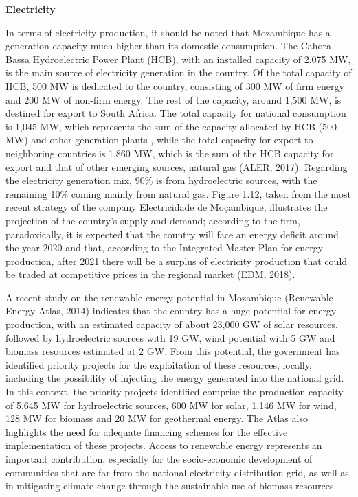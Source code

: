 \documentclass[
]{book}
\begin{document}
\textbf{Electricity}

In terms of electricity production, it should be noted that Mozambique has a generation capacity much higher than its domestic consumption. The Cahora Bassa Hydroelectric Power Plant (HCB), with an installed capacity of 2,075 MW, is the main source of electricity generation in the country. Of the total capacity of HCB, 500 MW is dedicated to the country, consisting of 300 MW of firm energy and 200 MW of non-firm energy. The rest of the capacity, around 1,500 MW, is destined for export to South Africa. The total capacity for national consumption is 1,045 MW, which represents the sum of the capacity allocated by HCB (500 MW) and other generation plants , while the total capacity for export to neighboring countries is 1,860 MW, which is the sum of the HCB capacity for export and that of other emerging sources, natural gas (ALER, 2017). Regarding the electricity generation mix, 90\% is from hydroelectric sources, with the remaining 10\% coming mainly from natural gas. Figure 1.12, taken from the most recent strategy of the company Electricidade de Moçambique, illustrates the projection of the country's supply and demand; according to the firm, paradoxically, it is expected that the country will face an energy deficit around the year 2020 and that, according to the Integrated Master Plan for energy production, after 2021 there will be a surplus of electricity production that could be traded at competitive prices in the regional market (EDM, 2018).

A recent study on the renewable energy potential in Mozambique (Renewable Energy Atlas, 2014) indicates that the country has a huge potential for energy production, with an estimated capacity of about 23,000 GW of solar resources, followed by hydroelectric sources with 19 GW, wind potential with 5 GW and biomass resources estimated at 2 GW. From this potential, the government has identified priority projects for the exploitation of these resources, locally, including the possibility of injecting the energy generated into the national grid. In this context, the priority projects identified comprise the production capacity of 5,645 MW for hydroelectric sources, 600 MW for solar, 1,146 MW for wind, 128 MW for biomass and 20 MW for geothermal energy. The Atlas also highlights the need for adequate financing schemes for the effective implementation of these projects. Access to renewable energy represents an important contribution, especially for the socio-economic development of communities that are far from the national electricity distribution grid, as well as in mitigating climate change through the sustainable use of biomass resources.
\end{document}
